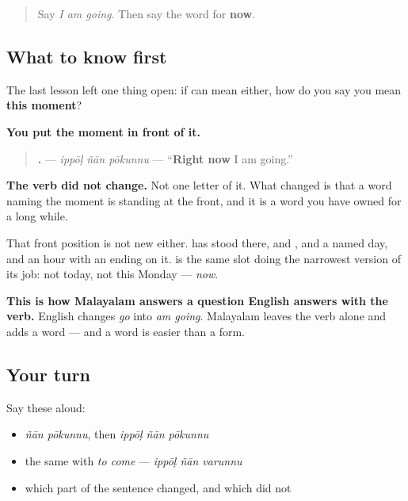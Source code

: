 \begin{quote}
Say \emph{I am going}. Then say the word for \textbf{now}.
\end{quote}

\subsection*{What to know first}
The last lesson left one thing open: if \textbf{ } can mean either, how do you say you mean \textbf{this moment}?

\textbf{You put the moment in front of it.}

\begin{quote}
\textbf{  .} — \emph{ippōḷ ñān pōkunnu} — \textquotedblleft{}\textbf{Right now} I am going.\textquotedblright{}
\end{quote}

\textbf{The verb did not change.} Not one letter of it. What changed is that a word naming the moment is standing at the front, and it is a word you have owned for a long while.

\begin{grammarlens}[title={Grammar Lens: the slot again}]
That front position is not new either. \textbf{} has stood there, and \textbf{}, and a named day, and an hour with an ending on it. \textbf{} is the same slot doing the narrowest version of its job: not today, not this Monday — \emph{now}.

\textbf{This is how Malayalam answers a question English answers with the verb.} English changes \emph{go} into \emph{am going}. Malayalam leaves the verb alone and adds a word — and a word is easier than a form.
\end{grammarlens}

\subsection*{Your turn}
Say these aloud:

\begin{itemize}
\raggedright
  \item \emph{ñān pōkunnu}, then \emph{ippōḷ ñān pōkunnu}
  \item the same with \emph{to come} — \emph{ippōḷ ñān varunnu}
  \item which part of the sentence changed, and which did not
\end{itemize}

